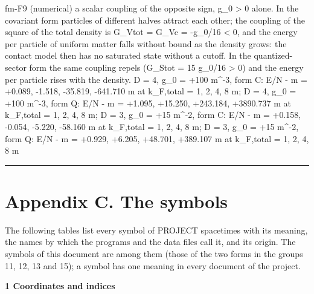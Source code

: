 \documentclass[
  10pt,
]{article}
\newenvironment{Shaded}{}{}
\newcommand{\NormalTok}[1]{#1}
\begin{document}
\begin{Shaded}
\begin{Highlighting}[]
\NormalTok{[PASS] fm{-}F9  (numerical) a scalar coupling of the opposite sign, g\_0 \textgreater{} 0 alone. In the covariant form particles of different halves attract each other; the coupling of the square of the total density is G\_Vtot = G\_Vc = {-}g\_0/16 \textless{} 0, and the energy per particle of uniform matter falls without bound as the density grows: the contact model then has no saturated state without a cutoff. In the quantized{-}sector form the same coupling repels (G\_Stot = 15 g\_0/16 \textgreater{} 0) and the energy per particle rises with the density. D = 4, g\_0 = +100 m\^{}{-}3, form C: E/N {-} m = +0.089, {-}1.518, {-}35.819, {-}641.710 m at k\_F,total = 1, 2, 4, 8 m; D = 4, g\_0 = +100 m\^{}{-}3, form Q: E/N {-} m = +1.095, +15.250, +243.184, +3890.737 m at k\_F,total = 1, 2, 4, 8 m; D = 3, g\_0 = +15 m\^{}{-}2, form C: E/N {-} m = +0.158, {-}0.054, {-}5.220, {-}58.160 m at k\_F,total = 1, 2, 4, 8 m; D = 3, g\_0 = +15 m\^{}{-}2, form Q: E/N {-} m = +0.929, +6.205, +48.701, +389.107 m at k\_F,total = 1, 2, 4, 8 m}
\end{Highlighting}
\end{Shaded}

\begin{center}\rule{0.5\linewidth}{0.5pt}\end{center}

\hypertarget{appendix-c.-the-symbols}{%
\section{Appendix C. The symbols}\label{appendix-c.-the-symbols}}

The following tables list every symbol of PROJECT spacetimes with its
meaning, the names by which the programs and the data files call it, and
its origin. The symbols of this document are among them (those of the
two forms in the groups 11, 12, 13 and 15); a symbol has one meaning in
every document of the project.

\textbf{1 Coordinates and indices}
\end{document}
